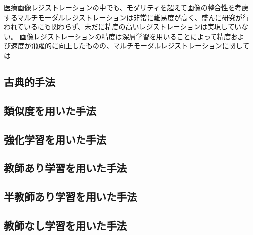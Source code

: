 

医療画像レジストレーションの中でも、モダリティを超えて画像の整合性を考慮するマルチモーダルレジストレーションは非常に難易度が高く、盛んに研究が行われているにも関わらず、未だに精度の高いレジストレーションは実現していない。
画像レジストレーションの精度は深層学習を用いることによって精度および速度が飛躍的に向上したものの、マルチモーダルレジストレーションに関しては

\subsection{古典的手法}

\subsection{類似度を用いた手法}

\subsection{強化学習を用いた手法}

\subsection{教師あり学習を用いた手法}

\subsection{半教師あり学習を用いた手法}

\subsection{教師なし学習を用いた手法}